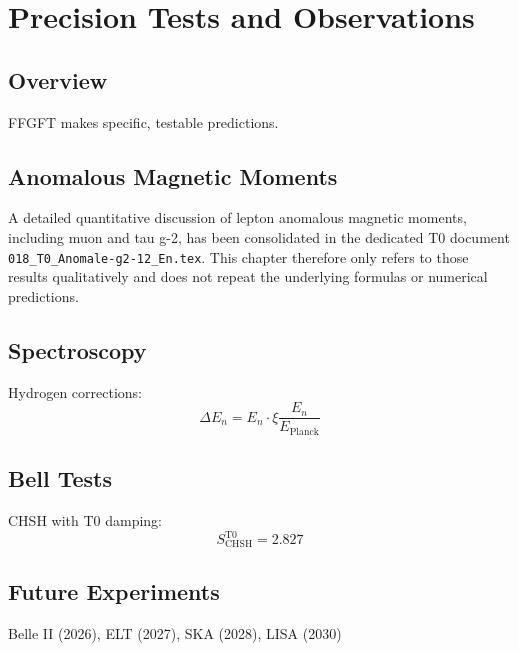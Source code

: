 
\chapter{Precision Tests and Observations}

\section{Overview}
FFGFT makes specific, testable predictions.

\section{Anomalous Magnetic Moments}

A detailed quantitative discussion of lepton anomalous magnetic moments, including muon and tau g-2,
has been consolidated in the dedicated T0 document \texttt{018\_T0\_Anomale-g2-12\_En.tex}.
This chapter therefore only refers to those results qualitatively and does not repeat the underlying
formulas or numerical predictions.

\section{Spectroscopy}
Hydrogen corrections:
\begin{equation}
	\Delta E_n = E_n \cdot \xi \frac{E_n}{E_{\text{Planck}}}
\end{equation}

\section{Bell Tests}
CHSH with T0 damping:
\begin{equation}
	S_{\text{CHSH}}^{\text{T0}} = 2.827
\end{equation}

\section{Future Experiments}
Belle II (2026), ELT (2027), SKA (2028), LISA (2030)


